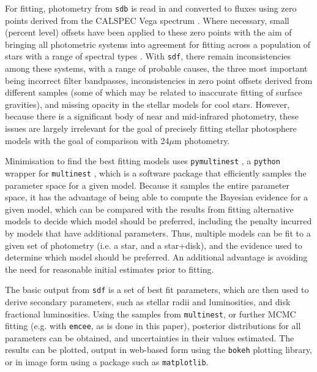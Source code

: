 \documentclass[a4paper,fleqn,usenatbib]{mnras}
\begin{document}
For fitting, photometry from \texttt{sdb} is read in and converted to
fluxes using zero points derived from the CALSPEC Vega spectrum
\citep{2014AJ....147..127B}. Where necessary, small (percent level)
offsets have been applied to these zero points with the aim of bringing
all photometric systems into agreement for fitting across a population
of stars with a range of spectral types \citep[see][for descriptions of
this type of approach, here the bandpasses are not altered
however]{2000PASP..112..961B,2015PASP..127..102M}. With \texttt{sdf},
there remain inconsistencies among these systems, with a range of
probable causes, the three most important being incorrect filter
bandpasses, inconsistencies in zero point offsets derived from different
samples (some of which may be related to inaccurate fitting of surface
gravities), and missing opacity in the stellar models for cool
stars. However, because there is a significant body of near and
mid-infrared photometry, these issues are largely irrelevant for the
goal of precisely fitting stellar photosphere models with the goal of
comparison with 24$\mu$m photometry.

Minimisation to find the best fitting models uses \texttt{pymultinest}
\citep{2014A&A...564A.125B}, a \texttt{python} wrapper for
\texttt{multinest} \citep{2009MNRAS.398.1601F}, which is a software
package that efficiently samples the parameter space for a given
model. Because it samples the entire parameter space, it has the
advantage of being able to compute the Bayesian evidence for a given
model, which can be compared with the results from fitting alternative
models to decide which model should be preferred, including the penalty
incurred by models that have additional parameters. Thus, multiple
models can be fit to a given set of photometry (i.e. a star, and a
star+disk), and the evidence used to determine which model should be
preferred. An additional advantage is avoiding the need for reasonable
initial estimates prior to fitting.

The basic output from \texttt{sdf} is a set of best fit parameters,
which are then used to derive secondary parameters, such as stellar
radii and luminosities, and disk fractional luminosities. Using the
samples from \texttt{multinest}, or further MCMC fitting (e.g. with
\texttt{emcee}, as is done in this paper), posterior distributions for
all parameters can be obtained, and uncertainties in their values
estimated. The results can be plotted, output in web-based form using
the \texttt{bokeh} plotting library, or in image form using a package
such as \texttt{matplotlib}.



\bsp	%
\label{lastpage}
\end{document}
